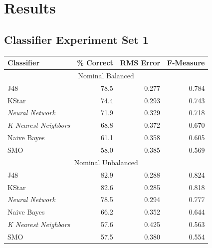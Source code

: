 \documentclass[../thesis/thesis.tex]{subfiles}
\begin{document}
 \chapter{Results}

 \section{Classifier Experiment Set 1}

\begin{table}
\centering
\begin{tabular}{|l|r|r|r|}
\hline
\textbf{Classifier}  & \textbf{\% Correct} & \textbf{RMS Error} & \textbf{F-Measure} \\ \hline

\multicolumn{4}{|c|}{Nominal Balanced} \\ \hline
J48         						& 78.5                        & 0.277             & 0.784              \\ \hline
KStar       						& 74.4                        & 0.293             & 0.743              \\ \hline
\textit{Neural Network}      		& 71.9                        & 0.329             & 0.718              \\ \hline
\textit{K Nearest Neighbors}		& 68.8                        & 0.372             & 0.670              \\ \hline
Naive Bayes 						& 61.1                        & 0.358             & 0.605              \\ \hline
SMO         						& 58.0                        & 0.385             & 0.569              \\ \hline

\multicolumn{4}{|c|}{Nominal Unbalanced} \\ \hline
J48         						& 82.9                        & 0.288             & 0.824              \\ \hline
KStar       						& 82.6                        & 0.285             & 0.818              \\ \hline
\textit{Neural Network}      		& 78.5                        & 0.294             & 0.777              \\ \hline
Naive Bayes							& 66.2                        & 0.352             & 0.644              \\ \hline
\textit{K Nearest Neighbors}   		& 57.6                        & 0.425             & 0.563              \\ \hline
SMO         						& 57.5                        & 0.380             & 0.554              \\ \hline


\end{tabular}
\end{table}
\end{document}
